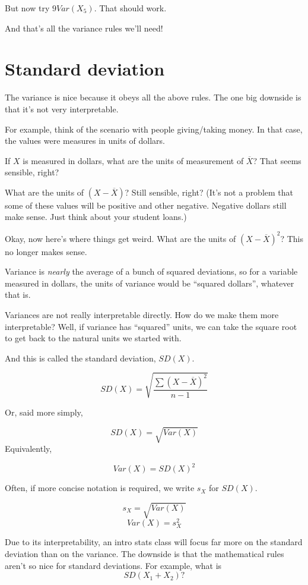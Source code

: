 \documentclass[
]{book}
\begin{document}
But now try \(9 Var\left(X_{5}\right)\). That should work.

And that's all the variance rules we'll need!

\hypertarget{variance-sd}{%
\section{Standard deviation}\label{variance-sd}}

The variance is nice because it obeys all the above rules. The one big downside is that it's not very interpretable.

For example, think of the scenario with people giving/taking money. In that case, the values were measures in units of dollars.

If \(X\) is measured in dollars, what are the units of measurement of \(\overline{X}\)? That seems sensible, right?

What are the units of \(\left(X - \overline{X}\right)\)? Still sensible, right? (It's not a problem that some of these values will be positive and other negative. Negative dollars still make sense. Just think about your student loans.)

Okay, now here's where things get weird. What are the units of \(\left(X - \overline{X}\right)^{2}\)? This no longer makes sense.

Variance is \emph{nearly} the average of a bunch of squared deviations, so for a variable measured in dollars, the units of variance would be ``squared dollars'', whatever that is.

Variances are not really interpretable directly. How do we make them more interpretable? Well, if variance has ``squared'' units, we can take the square root to get back to the natural units we started with.

And this is called the standard deviation, \(SD(X)\).

\[
SD(X) = \sqrt{\frac{\sum{\left(X - \overline{X}\right)^{2}}}
{n - 1}}
\]

Or, said more simply,

\[
SD(X) = \sqrt{Var(X)}
\]
Equivalently,

\[
Var(X) = SD(X)^2
\]

Often, if more concise notation is required, we write \(s_{X}\) for \(SD(X)\).

\[
s_{X} = \sqrt{Var(X)}
\]
\[
Var(X) = s_{X}^2
\]

Due to its interpretability, an intro stats class will focus far more on the standard deviation than on the variance. The downside is that the mathematical rules aren't so nice for standard deviations. For example, what is
\[
SD\left(X_{1} + X_{2}\right)?
\]
\end{document}
